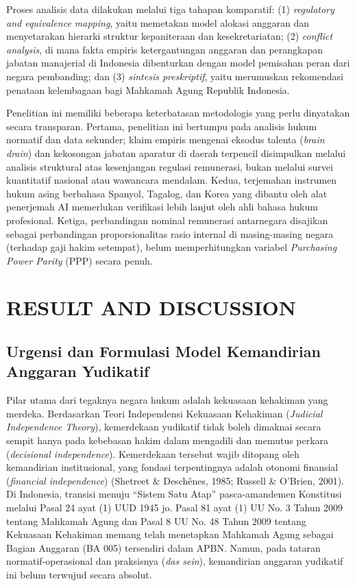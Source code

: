 \documentclass[12pt, a4paper]{article}
\begin{document}
Proses analisis data dilakukan melalui tiga tahapan komparatif: (1) \textit{regulatory and equivalence mapping}, yaitu memetakan model alokasi anggaran dan menyetarakan hierarki struktur kepaniteraan dan kesekretariatan; (2) \textit{conflict analysis}, di mana fakta empiris ketergantungan anggaran dan perangkapan jabatan manajerial di Indonesia dibenturkan dengan model pemisahan peran dari negara pembanding; dan (3) \textit{sintesis preskriptif}, yaitu merumuskan rekomendasi penataan kelembagaan bagi Mahkamah Agung Republik Indonesia.

Penelitian ini memiliki beberapa keterbatasan metodologis yang perlu dinyatakan secara transparan. Pertama, penelitian ini bertumpu pada analisis hukum normatif dan data sekunder; klaim empiris mengenai eksodus talenta (\textit{brain drain}) dan kekosongan jabatan aparatur di daerah terpencil disimpulkan melalui analisis struktural atas kesenjangan regulasi remunerasi, bukan melalui survei kuantitatif nasional atau wawancara mendalam. Kedua, terjemahan instrumen hukum asing berbahasa Spanyol, Tagalog, dan Korea yang dibantu oleh alat penerjemah AI memerlukan verifikasi lebih lanjut oleh ahli bahasa hukum profesional. Ketiga, perbandingan nominal remunerasi antarnegara disajikan sebagai perbandingan proporsionalitas rasio internal di masing-masing negara (terhadap gaji hakim setempat), belum memperhitungkan variabel \textit{Purchasing Power Parity} (PPP) secara penuh.

\section{RESULT AND DISCUSSION}

\subsection{Urgensi dan Formulasi Model Kemandirian Anggaran Yudikatif}

Pilar utama dari tegaknya negara hukum adalah kekuasaan kehakiman yang merdeka. Berdasarkan Teori Independensi Kekuasaan Kehakiman (\textit{Judicial Independence Theory}), kemerdekaan yudikatif tidak boleh dimaknai secara sempit hanya pada kebebasan hakim dalam mengadili dan memutus perkara (\textit{decisional independence}). Kemerdekaan tersebut wajib ditopang oleh kemandirian institusional, yang fondasi terpentingnya adalah otonomi finansial (\textit{financial independence}) (Shetreet \& Deschênes, 1985; Russell \& O'Brien, 2001). Di Indonesia, transisi menuju ``Sistem Satu Atap'' pasca-amandemen Konstitusi melalui Pasal 24 ayat (1) UUD 1945 jo. Pasal 81 ayat (1) UU No. 3 Tahun 2009 tentang Mahkamah Agung dan Pasal 8 UU No. 48 Tahun 2009 tentang Kekuasaan Kehakiman memang telah menetapkan Mahkamah Agung sebagai Bagian Anggaran (BA 005) tersendiri dalam APBN. Namun, pada tataran normatif-operasional dan praksisnya (\textit{das sein}), kemandirian anggaran yudikatif ini belum terwujud secara absolut.
\end{document}
